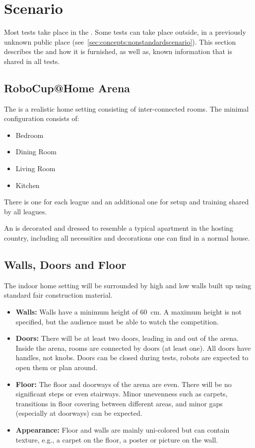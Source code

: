 \section{Scenario}
\label{sec:rules:scenario}
Most tests take place in the \RoboCup\AtHome{} \Arena{}. Some tests can take place outside, in a previously unknown public place (see~\ref{sec:concepts:nonstandardscenario}). This section describes the \Arena{} and how it is furnished,  as well as, known information that is shared in all tests. 

\subsection{RoboCup@Home Arena}
\label{sec:rules:scenario:arena}
The \RoboCup\AtHome{} \Arena{} is a realistic home setting consisting of inter-connected rooms.
The minimal configuration consists of:
\begin{itemize}
	\item Bedroom
	\item Dining Room
	\item Living Room
	\item Kitchen
\end{itemize}
There is one \Arena{} for each league and an additional one for setup and training shared by all leagues.

An \Arena{} is decorated and dressed to resemble a typical apartment in the hosting country, including all necessities and decorations one can find in a normal house.

\subsection{Walls, Doors and Floor}
\label{sec:rules:scenario:walls}
The indoor home setting will be surrounded by high and low walls built up using standard fair construction material.

\begin{itemize}
	\item \textbf{Walls:} Walls have a minimum height of \SI{60}{\centi\meter}. A maximum height is not specified, but the audience must be able to watch the competition.

	\item \textbf{Doors:} There will be at least two doors, leading in and out of the arena.
	Inside the arena, rooms are connected by doors (at least one).
	All doors have handles, not knobs.
	Doors can be closed during tests, robots are expected to open them or plan around.

	\item \textbf{Floor:} The floor and doorways of the arena are even.
	There will be no significant steps or even stairways.
	Minor unevenness such as carpets, transitions in floor covering between different areas, and minor gaps (especially at doorways) can be expected.

	\item \textbf{Appearance:} Floor and walls are mainly uni-colored but can contain texture, e.g., a carpet on the floor, a poster or picture on the wall.\\
\end{itemize}


